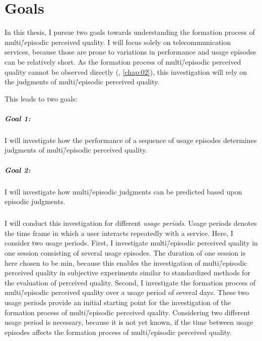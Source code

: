 
\section{Goals}
In this thesis, I pursue two goals towards understanding the formation process of multi\=/episodic perceived quality.
I will focus solely on telecommunication services, because those are prone to variations in performance and usage episodes can be relatively short.
As the formation process of multi\=/episodic perceived quality cannot be observed directly (\cf, \autoref{chap:02}), this investigation will rely on the judgments of multi\=/episodic perceived quality.

This leads to two goals:

\subparagraph*{Goal 1:}
I will investigate how the performance of a sequence of usage episodes determines judgments of multi\=/episodic perceived quality.

\subparagraph*{Goal 2:}
I will investigate how multi\=/episodic judgments can be predicted based upon episodic judgments.

\subparagraph*{}
I will conduct this investigation for different \emph{usage periods}.
Usage periods denotes the time frame in which a user interacts repeatedly with a service.
Here, I consider two usage periods.
First, I investigate multi\=/episodic perceived quality in one session consisting of several usage episodes.
The duration of one session is here chosen to be \unit[45]{min}, because this enables the investigation of multi\=/episodic perceived quality in subjective experiments similar to standardized methods for the evaluation of perceived quality.
Second, I investigate the formation process of multi\=/episodic perceived quality over a usage period of several days.
These two usage periods provide an initial starting point for the investigation of the formation process of multi\=/episodic perceived quality.
Considering two different usage period is necessary, because it is not yet known, if the time between usage episodes affects the formation process of multi\=/episodic perceived quality.

